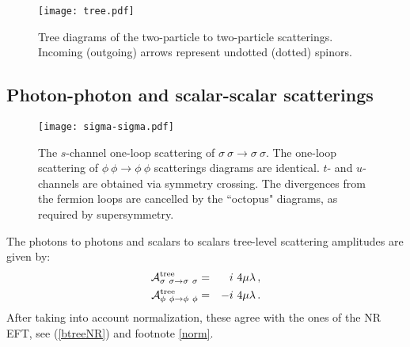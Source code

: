 \documentclass[11pt]{article}
\begin{document}
\begin{figure}[t] %
   \centering
   \texttt{[image: tree.pdf]} 
   \caption{Tree diagrams of the two-particle to two-particle scatterings. Incoming (outgoing) arrows represent undotted (dotted) spinors.}
	\label{Tree diagrams}
\end{figure}



\subsection*{Photon-photon and scalar-scalar scatterings}

\begin{figure}[t] %
   \centering
   \texttt{[image: sigma-sigma.pdf]} 
   \caption{The $s$-channel one-loop scattering of $\sigma~\sigma\rightarrow \sigma~\sigma$. The one-loop scattering of $\phi~\phi\rightarrow \phi~\phi$ scatterings diagrams are identical. $t$- and $u$-channels are obtained via symmetry crossing. The divergences from the fermion loops are cancelled by the ``octopus" diagrams, as required by supersymmetry.}
	\label{sigma sigma one loop}
\end{figure}

The photons to photons and scalars to scalars  tree-level scattering amplitudes are given by:
%
\begin{eqnarray}
\nonumber
{\cal A}^{\scriptsize\mbox{tree}}_{\sigma~\sigma\rightarrow \sigma~\sigma}&=&i~4\mu\lambda\,,\\
{\cal A}^{\scriptsize\mbox{tree}}_{\phi~\phi\rightarrow \phi~\phi}&=&-i~4\mu\lambda\,.
\end{eqnarray}
%
After taking into account normalization, these agree with the ones of the NR EFT, see (\ref{btreeNR}) and footnote \ref{norm}.
\end{document}
